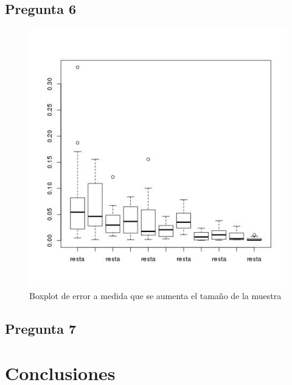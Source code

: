 \documentclass[letter,10pt]{article}
\begin{document}
\subsection{Pregunta 6}

       \begin{figure}[H]
	      \centering
              \includegraphics[width=\linewidth]{p6_boxplot.jpg}
              \caption{Boxplot de error a medida que se aumenta el tamaño de la muestra}
          \end{figure}



\subsection{Pregunta 7}





\section{Conclusiones}




%
%

\end{document}
